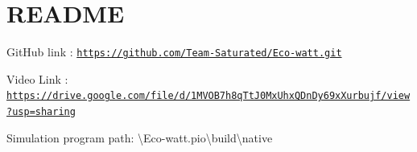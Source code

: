 \chapter{README }
\hypertarget{md__r_e_a_d_m_e}{}\label{md__r_e_a_d_m_e}
Git\+Hub link \+: \href{https://github.com/Team-Saturated/Eco-watt.git}{\texttt{https\+://github.\+com/\+Team-\/\+Saturated/\+Eco-\/watt.\+git}}

Video Link \+: \href{https://drive.google.com/file/d/1MVOB7h8qTtJ0MxUhxQDnDy69xXurbujf/view?usp=sharing}{\texttt{https\+://drive.\+google.\+com/file/d/1\+MVOB7h8q\+Tt\+J0\+Mx\+Uhx\+QDn\+Dy69x\+Xurbujf/view?usp=sharing}}

Simulation program path\+: \textbackslash{}\+Eco-\/watt.pio\textbackslash{}build\textbackslash{}native 